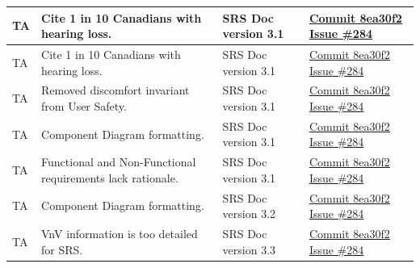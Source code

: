 \documentclass{article}
\begin{document}
\begin{longtable}{|p{2cm}|p{4.5cm}|p{3.5cm}|p{3cm}|}
    TA &
    Cite 1 in 10 Canadians with hearing loss. &
    SRS Doc version 3.1 & 
    \href{https://github.com/Team6-SixSense/audio360/commit/8ea30f2}{Commit
        8ea30f2}
    \newline
    \href{https://github.com/Team6-SixSense/audio360/issues/284}{Issue \#284} \\
    \hline

    TA &
    Cite 1 in 10 Canadians with hearing loss. &
    SRS Doc version 3.1 & 
    \href{https://github.com/Team6-SixSense/audio360/commit/8ea30f2}{Commit
        8ea30f2}
    \newline
    \href{https://github.com/Team6-SixSense/audio360/issues/284}{Issue \#284} \\
    \hline

    TA &
    Removed discomfort invariant from User Safety. &
    SRS Doc version 3.1 & 
    \href{https://github.com/Team6-SixSense/audio360/commit/8ea30f2}{Commit
        8ea30f2}
    \newline
    \href{https://github.com/Team6-SixSense/audio360/issues/284}{Issue \#284} \\
    \hline

    TA &
    Component Diagram formatting. &
    SRS Doc version 3.1 & 
    \href{https://github.com/Team6-SixSense/audio360/commit/8ea30f2}{Commit
        8ea30f2}
    \newline
    \href{https://github.com/Team6-SixSense/audio360/issues/284}{Issue \#284} \\
    \hline

    TA &
    Functional and Non-Functional requirements lack rationale. &
    SRS Doc version 3.1 & 
    \href{https://github.com/Team6-SixSense/audio360/commit/8ea30f2}{Commit
        8ea30f2}
    \newline
    \href{https://github.com/Team6-SixSense/audio360/issues/284}{Issue \#284} \\
    \hline

    TA &
    Component Diagram formatting. &
    SRS Doc version 3.2 & 
    \href{https://github.com/Team6-SixSense/audio360/commit/8ea30f2}{Commit
        8ea30f2}
    \newline
    \href{https://github.com/Team6-SixSense/audio360/issues/284}{Issue \#284} \\
    \hline

    TA &
    VnV information is too detailed for SRS. &
    SRS Doc version 3.3 & 
    \href{https://github.com/Team6-SixSense/audio360/commit/8ea30f2}{Commit
        8ea30f2}
    \newline
    \href{https://github.com/Team6-SixSense/audio360/issues/284}{Issue \#284} \\
    \hline


\end{longtable}
\end{document}
